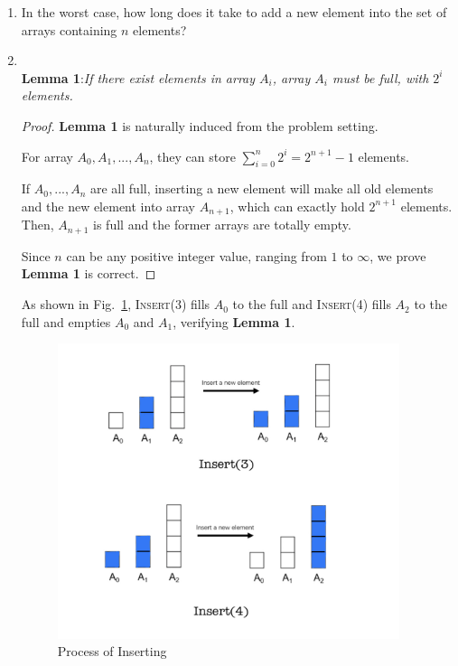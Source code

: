 \documentclass[12pt,a4paper]{article}
\makeatletter
\newtheorem*{solution}{Solution}
\theoremstyle{definition}
\renewenvironment{solution}[1][Solution] {\par\pushQED{\qed}\normalfont\topsep6\p@\@plus6\p@\relax\trivlist\item[\hskip\labelsep\bfseries#1\@addpunct{.}]\ignorespaces}{\popQED\endtrivlist\@endpefalse} \makeatother
\makeatother
\begin{document}
\begin{enumerate}
    \begin{enumerate}
        \item In the worst case, how long does it take to add a new element into the set of arrays containing $n$ elements?
        \begin{solution}
        ~\\
        \textbf{Lemma 1}:\textit{If there exist elements in array $A_i$, array $A_i$ must be full, with $2^i$ elements.}
        
        \begin{proof}
        \textbf{Lemma 1} is naturally induced from the problem setting.
        
        For array $A_0,A_1,...,A_n$, they can store $\sum_{i=0}^n 2^i = 2^{n+1}-1$ elements.
        
        If $A_0,...,A_n$ are all full, inserting a new element will make all old elements and the new element into array $A_{n+1}$, which can exactly hold $2^{n+1}$ elements. Then, $A_{n+1}$ is full and the former arrays are  totally empty.
        
        Since $n$ can be any positive integer value, ranging from $1$ to $\infty$, we prove \textbf{Lemma 1} is correct.
        \end{proof}
        
        As shown in Fig.~\ref{p31}, \textsc{Insert(3)} fills $A_0$ to the full and \textsc{Insert(4)} fills $A_2$ to the full and empties $A_0$ and $A_1$, verifying \textbf{Lemma 1}.
        \begin{figure}[H]
            \centering
            \includegraphics[width=10cm]{2.jpg}
            \caption{Process of Inserting}
            \label{p31}
        \end{figure}
        

\end{solution}
\end{enumerate}
\end{enumerate}
\end{document}
